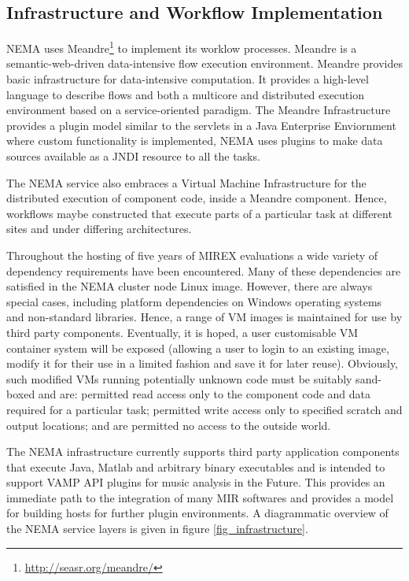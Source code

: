 \documentclass[conference]{IEEEtran}
\begin{document}
\subsection{Infrastructure and Workflow Implementation}
NEMA uses Meandre\footnote{\url{http://seasr.org/meandre/}} to implement its worklow processes. Meandre is a semantic-web-driven data-intensive flow execution environment. Meandre provides basic infrastructure for data-intensive computation. It provides a high-level language to describe flows and both a multicore and distributed execution environment based on a service-oriented paradigm. The Meandre Infrastructure provides a plugin model similar to the servlets in a Java Enterprise Enviornment where custom functionality is implemented, NEMA uses plugins to make data sources available as a JNDI \cite{lee2000jndi} resource to all the tasks.

The NEMA service also embraces a Virtual Machine Infrastructure for the distributed execution of component code, inside a Meandre component. Hence, workflows maybe constructed that execute parts of a particular task at different sites and under differing architectures.

Throughout the hosting of five years of MIREX evaluations a wide variety of dependency requirements have been encountered. Many of these dependencies are satisfied in the NEMA cluster node Linux image. However, there are always special cases, including platform dependencies on Windows operating systems and non-standard libraries. Hence, a range of VM images is maintained for use by third party components.
Eventually, it is hoped, a user customisable VM container system will be exposed (allowing a user to login to an existing image, modify it for their use in a limited fashion and save it for later reuse).
Obviously, such modified VMs running potentially unknown code must be suitably sand-boxed and are: permitted read access only to the component code and data required for a particular task; permitted write access only to specified scratch and output locations; and are permitted no access to the outside world.

The NEMA infrastructure currently supports third party application components that execute Java, Matlab and arbitrary binary executables and is intended to support VAMP API plugins \cite{cannam2006sonic} for music analysis in the Future. This provides an immediate path to the integration of many MIR softwares and provides a model for building hosts for further plugin environments. A diagrammatic overview of the NEMA service layers is given in figure \ref{fig_infrastructure}.
\end{document}
